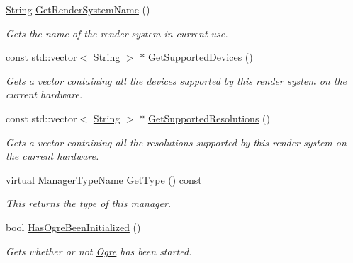 \begin{DoxyCompactItemize}
\hyperlink{namespaceMezzanine_acf9fcc130e6ebf08e3d8491aebcf1c86}{String} \hyperlink{classMezzanine_1_1GraphicsManager_af3ed012f12d5eac824cde585c982792f}{GetRenderSystemName} ()
\begin{DoxyCompactList}\small\item\em Gets the name of the render system in current use. \item\end{DoxyCompactList}\item 
const std::vector$<$ \hyperlink{namespaceMezzanine_acf9fcc130e6ebf08e3d8491aebcf1c86}{String} $>$ $\ast$ \hyperlink{classMezzanine_1_1GraphicsManager_a0cff2e9eaa6164de34c0fb1042f65014}{GetSupportedDevices} ()
\begin{DoxyCompactList}\small\item\em Gets a vector containing all the devices supported by this render system on the current hardware. \item\end{DoxyCompactList}\item 
const std::vector$<$ \hyperlink{namespaceMezzanine_acf9fcc130e6ebf08e3d8491aebcf1c86}{String} $>$ $\ast$ \hyperlink{classMezzanine_1_1GraphicsManager_a88383aa6cdfe9bd8aec1bc4955568388}{GetSupportedResolutions} ()
\begin{DoxyCompactList}\small\item\em Gets a vector containing all the resolutions supported by this render system on the current hardware. \item\end{DoxyCompactList}\item 
virtual \hyperlink{classMezzanine_1_1ManagerBase_a08cecf5169cad3e82be81a3a159b0b6e}{ManagerTypeName} \hyperlink{classMezzanine_1_1GraphicsManager_a4a036b7a4623e9f568310a90d5e34e46}{GetType} () const 
\begin{DoxyCompactList}\small\item\em This returns the type of this manager. \item\end{DoxyCompactList}\item 
bool \hyperlink{classMezzanine_1_1GraphicsManager_ad440eb301b479b7b1e387dc08e7d5444}{HasOgreBeenInitialized} ()
\begin{DoxyCompactList}\small\item\em Gets whether or not \hyperlink{namespaceOgre}{Ogre} has been started. \item\end{DoxyCompactList}\item 

\end{DoxyCompactItemize}
